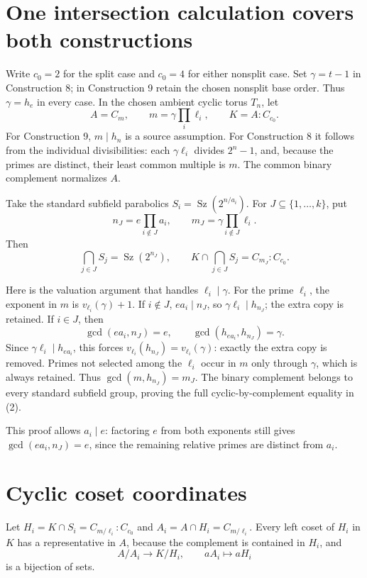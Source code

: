 \documentclass[11pt,a4paper]{article}
\begin{document}
\section{One intersection calculation covers both
constructions}\label{one-intersection-calculation-covers-both-constructions}

Write \(c_0=2\) for the split case and \(c_0=4\) for either nonsplit
case. Set \(\gamma=t-1\) in Construction 8; in Construction 9 retain the
chosen nonsplit base order. Thus \(\gamma=h_e\) in every case. In the
chosen ambient cyclic torus \(T_n\), let \[
A=C_m,\qquad m=\gamma\prod_i\ell_i,\qquad
K=A:C_{c_0}.
\] For Construction 9, \(m\mid h_n\) is a source assumption. For
Construction 8 it follows from the individual divisibilities: each
\(\gamma\ell_i\) divides \(2^n-1\), and, because the primes are
distinct, their least common multiple is \(m\). The common binary
complement normalizes \(A\).

Take the standard subfield parabolics
\(S_i=\operatorname{Sz}(2^{n/a_i})\). For \(J\subseteq\{1,\ldots,k\}\),
put \[
n_J=e\prod_{i\notin J}a_i,\qquad
m_J=\gamma\prod_{i\notin J}\ell_i.
\] Then \[
\bigcap_{j\in J}S_j=\operatorname{Sz}(2^{n_J}),\qquad
K\cap\bigcap_{j\in J}S_j=C_{m_J}:C_{c_0}.
\tag{2}
\]

Here is the valuation argument that handles \(\ell_i\mid\gamma\). For
the prime \(\ell_i\), the exponent in \(m\) is \(v_{\ell_i}(\gamma)+1\).
If \(i\notin J\), \(ea_i\mid n_J\), so \(\gamma\ell_i\mid h_{n_J}\); the
extra copy is retained. If \(i\in J\), then \[
\gcd(ea_i,n_J)=e,\qquad
\gcd(h_{ea_i},h_{n_J})=\gamma.
\] Since \(\gamma\ell_i\mid h_{ea_i}\), this forces
\(v_{\ell_i}(h_{n_J})=v_{\ell_i}(\gamma)\): exactly the extra copy is
removed. Primes not selected among the \(\ell_i\) occur in \(m\) only
through \(\gamma\), which is always retained. Thus
\(\gcd(m,h_{n_J})=m_J\). The binary complement belongs to every standard
subfield group, proving the full cyclic-by-complement equality in (2).

This proof allows \(a_i\mid e\): factoring \(e\) from both exponents
still gives \(\gcd(ea_i,n_J)=e\), since the remaining relative primes
are distinct from \(a_i\).

\section{Cyclic coset coordinates}\label{cyclic-coset-coordinates}

Let \(H_i=K\cap S_i=C_{m/\ell_i}:C_{c_0}\) and
\(A_i=A\cap H_i=C_{m/\ell_i}\). Every left coset of \(H_i\) in \(K\) has
a representative in \(A\), because the complement is contained in
\(H_i\), and \[
A/A_i\longrightarrow K/H_i,\qquad aA_i\longmapsto aH_i
\] is a bijection of sets.
\end{document}
